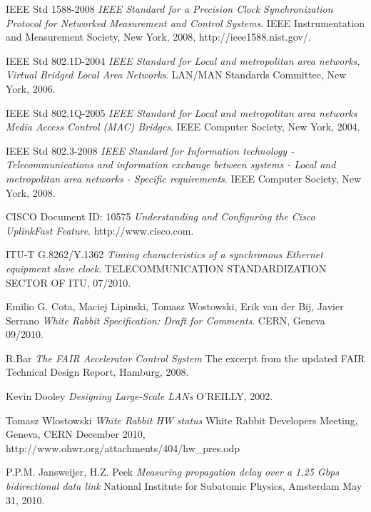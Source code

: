 
\begin{thebibliography}{9}

  IEEE Std 1588-2008
  \emph{IEEE Standard for a Precision Clock Synchronization Protocol for
Networked Measurement and Control Systems}.
  IEEE Instrumentation and Measurement Society, New York,
  2008,
  http://ieee1588.nist.gov/.

  IEEE Std 802.1D-2004
  \emph{IEEE Standard for Local and metropolitan area networks, Virtual Bridged
Local Area Networks}.
  LAN/MAN Standards Committee, New York,
  2006.

  IEEE Std 802.1Q-2005
  \emph{IEEE Standard for Local and metropolitan area networks Media Access
  Control (MAC) Bridges}.
  IEEE Computer Society, New York,
  2004.

  IEEE Std 802.3-2008
  \emph{IEEE Standard for Information technology - Telecommunications and
information exchange between systems - Local and metropolitan area networks -
Specific requirements}.
  IEEE Computer Society, New York,
  2008.

  CISCO Document ID: 10575
  \emph{Understanding and Configuring the Cisco UplinkFast Feature}.
  http://www.cisco.com.

  ITU-T G.8262/Y.1362
  \emph{Timing characteristics of a synchronous
  Ethernet equipment slave clock}.
  TELECOMMUNICATION STANDARDIZATION SECTOR OF ITU, 
  07/2010.

 Emilio G. Cota, Maciej Lipinski, Tomasz Wostowski, Erik van der Bij, Javier
 Serrano
  \emph{White Rabbit Specification: Draft for Comments}.
  CERN, Geneva
  09/2010.

  R.Bar
   \emph{The FAIR Accelerator Control System}
   The excerpt from the updated FAIR Technical Design Report,
   Hamburg,
   2008.
   
  Kevin Dooley
  \emph{Designing Large-Scale LANs}
  O'REILLY,
  2002.

  Tomasz Wlostowski
  \emph{White Rabbit HW status}
  White Rabbit Developers Meeting, Geneva, CERN
  December 2010,
  http://www.ohwr.org/attachments/404/hw\_pres.odp

  P.P.M. Jansweijer,
  H.Z. Peek
  \emph{Measuring propagation delay over a 1.25 Gbps
         bidirectional data link}
  National Institute for Subatomic Physics, Amsterdam
  May 31, 2010.


\end{thebibliography}
